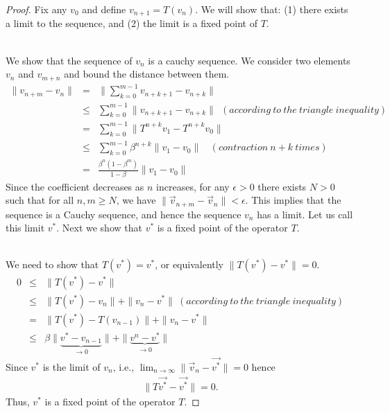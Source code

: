 \begin{proof}
Fix any $v_0$ and define $v_{n+1}=T(v_n)$. We will show that: (1)
there exists a limit to the sequence, and (2) the limit is a fixed
point of $T$.

\bigskip
{}\\
We show that the sequence of $v_n$ is a cauchy sequence. We consider
two elements $v_n$ and $v_{m+n}$ and bound the distance between them.
\begin{eqnarray*}
\|v_{n+m}-v_n\| & = & \|\sum_{k=0}^{m-1}v_{n+k+1}-v_{n+k}\|\\
& \leq & \sum_{k=0}^{m-1}\|v_{n+k+1}-v_{n+k}\| \ \ (according\ to\
the\ triangle\ inequality)\\& = &
\sum_{k=0}^{m-1}\|T^{n+k}v_1-T^{n+k}v_0\|\\ & \leq &
\sum_{k=0}^{m-1}\beta^{n+k}\|v_1-v_0\|\ \ \ \ (contraction\ n+k\
times)\\& = & \frac{\beta^n(1-\beta^m)}{1-\beta}\|v_1-v_0\|
\end{eqnarray*}
Since the coefficient decreases as $n$ increases, for any $ \epsilon
> 0$ there exists   $N
> 0$  such that for all $ n,m \geq N$, we have $\|\vec{v}_{n+m}-\vec{v}_n\| <
\epsilon$. This implies that the sequence is a Cauchy sequence, and
hence the sequence $v_n$ has a limit. Let us call this limit
${v^*}$. Next we show that ${v^*}$ is a fixed point of the operator
$T$.

\bigskip
{}\\
We need to show that $T(v^*)=v^*$, or equivalently
$\|T(v^*)-v^*\|=0$.
\begin{eqnarray*}
0 & \leq & \|T(v^*)-v^*\|\\
& \leq & \|T(v^*)-v_n\|  +  \|v_n-v^*\|\ (according\ to\ the \
triangle\ inequality)\\
& = & \|T(v^*)-T(v_{n-1})\|  +  \|v_n-v^*\|\\
& \leq & \beta\|\underbrace{v^*-v_{n-1}}_{\rightarrow 0 }\|  +
\|\underbrace{v^{n}-v^*}_{\rightarrow 0}\|
\end{eqnarray*}
Since $v^*$ is the limit of $v_n$, i.e.,
$\lim_{n\rightarrow\infty}\|\vec{v}_n-\vec{v^*}\| = 0 $ hence
\begin{eqnarray*}
\|T\vec{v^*}-\vec{v^*}\| = 0.
\end{eqnarray*}
Thus, $v^*$ is a fixed point of the operator $T$.


\end{proof}
